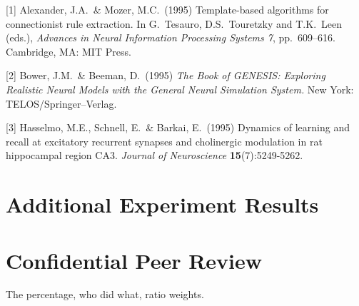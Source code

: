 \documentclass{article}
\begin{document}
{
\small


[1] Alexander, J.A.\ \& Mozer, M.C.\ (1995) Template-based algorithms for
connectionist rule extraction. In G.\ Tesauro, D.S.\ Touretzky and T.K.\ Leen
(eds.), {\it Advances in Neural Information Processing Systems 7},
pp.\ 609--616. Cambridge, MA: MIT Press.


[2] Bower, J.M.\ \& Beeman, D.\ (1995) {\it The Book of GENESIS: Exploring
  Realistic Neural Models with the General Neural Simulation System.}  New York:
TELOS/Springer--Verlag.


[3] Hasselmo, M.E., Schnell, E.\ \& Barkai, E.\ (1995) Dynamics of learning and
recall at excitatory recurrent synapses and cholinergic modulation in rat
hippocampal region CA3. {\it Journal of Neuroscience} {\bf 15}(7):5249-5262.
}

\section*{Additional Experiment Results}

\section*{Confidential Peer Review} 

The percentage, who did what, ratio weights. 
\end{document}
